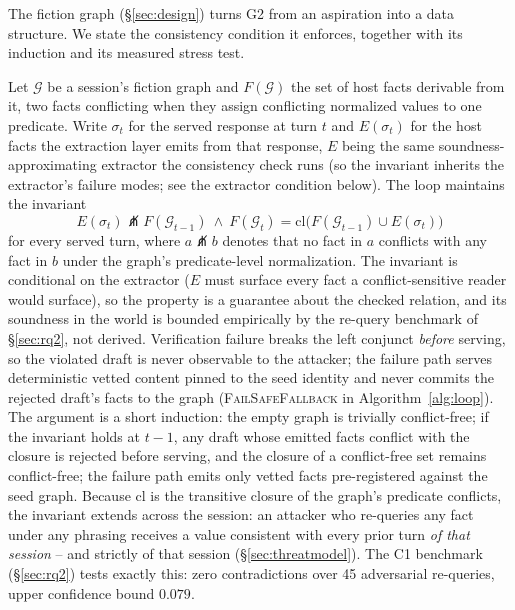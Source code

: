 The fiction graph (\S\ref{sec:design}) turns G2 from an aspiration into a
data structure. We state the consistency condition it enforces, together
with its induction and its measured stress test.\begin{property}
\label{prop:consistency}
Let $\mathcal{G}$ be a session's fiction graph and $F(\mathcal{G})$ the
set of host facts derivable from it, two facts conflicting when they assign
conflicting normalized values to one predicate. Write $\sigma_t$ for the
served response at turn $t$ and $E(\sigma_t)$ for the host facts the
extraction layer emits from that response, $E$ being the same
soundness-approximating extractor the consistency check runs (so the
invariant inherits the extractor's failure modes; see the extractor
condition below). The loop maintains the invariant
\begin{equation*}
E(\sigma_t) \not\pitchfork F(\mathcal{G}_{t-1}) \ \wedge \ F(\mathcal{G}_t) = \mathrm{cl}\big(F(\mathcal{G}_{t-1}) \cup E(\sigma_t)\big)
\end{equation*}
for every served turn, where $a \not\pitchfork b$ denotes that no fact
in $a$ conflicts with any fact in $b$ under the graph's predicate-level
normalization. The invariant is conditional on the extractor ($E$ must
surface every fact a conflict-sensitive reader would surface), so the
property is a guarantee about the checked relation, and its soundness in
the world is bounded empirically by the re-query benchmark of
\S\ref{sec:rq2}, not derived. Verification failure breaks the left
conjunct \emph{before} serving, so the violated draft is never
observable to the attacker; the failure path serves deterministic vetted
content pinned to the seed identity and never commits the rejected
draft's facts to the graph (\textsc{FailSafeFallback} in
Algorithm~\ref{alg:loop}). The argument is a short induction: the empty
graph is trivially conflict-free; if the invariant holds at $t-1$, any
draft whose emitted facts conflict with the closure is rejected before
serving, and the closure of a conflict-free set remains conflict-free;
the failure path emits only vetted facts pre-registered against the
seed graph. Because $\mathrm{cl}$ is the transitive closure of the
graph's predicate conflicts, the invariant extends across the session:
an attacker who re-queries any fact under any phrasing receives a value
consistent with every prior turn \emph{of that session} -- and strictly
of that session (\S\ref{sec:threatmodel}). The C1 benchmark
(\S\ref{sec:rq2}) tests exactly this: zero contradictions over 45
adversarial re-queries, upper confidence bound $0.079$.
\end{property}

